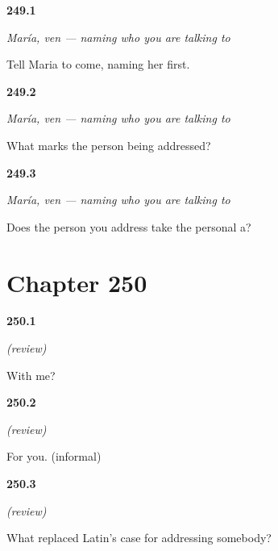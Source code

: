 \noindent\begin{minipage}[t]{\linewidth}
\raggedright
\hypertarget{review-ES-C64-maria-ven-say}{\textbf{249.1}} \emph{María, ven — naming who you are talking to}\par
\small Tell Maria to come, naming her first.
\end{minipage}\par\medskip

\noindent\begin{minipage}[t]{\linewidth}
\raggedright
\hypertarget{review-ES-C64-maria-ven-mark}{\textbf{249.2}} \emph{María, ven — naming who you are talking to}\par
\small What marks the person being addressed?
\end{minipage}\par\medskip

\noindent\begin{minipage}[t]{\linewidth}
\raggedright
\hypertarget{review-ES-C64-maria-ven-noa}{\textbf{249.3}} \emph{María, ven — naming who you are talking to}\par
\small Does the person you address take the personal a?
\end{minipage}\par\medskip

\section*{Chapter 250}

\noindent\begin{minipage}[t]{\linewidth}
\raggedright
\hypertarget{review-ES-C64-repaso-tonicos-with}{\textbf{250.1}} \emph{(review)}\par
\small With me?
\end{minipage}\par\medskip

\noindent\begin{minipage}[t]{\linewidth}
\raggedright
\hypertarget{review-ES-C64-repaso-tonicos-for}{\textbf{250.2}} \emph{(review)}\par
\small For you. (informal)
\end{minipage}\par\medskip

\noindent\begin{minipage}[t]{\linewidth}
\raggedright
\hypertarget{review-ES-C64-repaso-tonicos-comma}{\textbf{250.3}} \emph{(review)}\par
\small What replaced Latin's case for addressing somebody?
\end{minipage}\par\medskip

